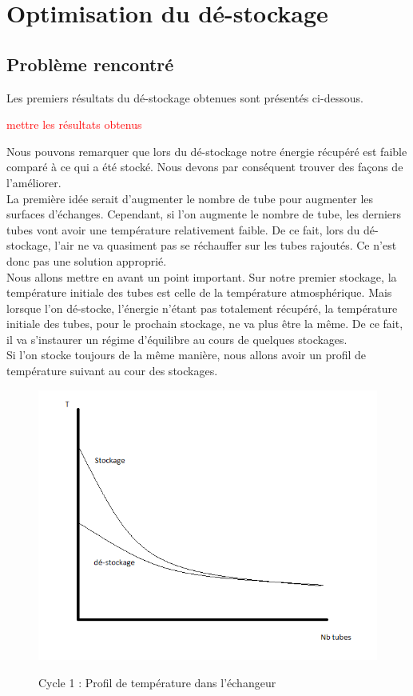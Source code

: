 \chapter{Optimisation du dé-stockage}

\section{Problème rencontré}

Les premiers résultats du dé-stockage obtenues sont présentés ci-dessous.


\textcolor{red}{mettre les résultats obtenus}


Nous pouvons remarquer que lors du dé-stockage notre énergie récupéré est faible comparé à ce qui a été stocké. Nous devons par conséquent trouver des façons de l'améliorer. \\

La première idée serait d'augmenter le nombre de tube pour augmenter les surfaces d'échanges. Cependant, si l'on augmente le nombre de tube, les derniers tubes vont avoir une température relativement faible. De ce fait, lors du dé-stockage, l'air ne va quasiment pas se réchauffer sur les tubes rajoutés. Ce n'est donc pas une solution approprié. \\

Nous allons mettre en avant un point important. Sur notre premier stockage, la température initiale des tubes est celle de la température atmosphérique. Mais lorsque l'on dé-stocke, l'énergie n'étant pas totalement récupéré, la température initiale des tubes, pour le prochain stockage, ne va plus être la même. De ce fait, il va s'instaurer un régime d'équilibre au cours de quelques stockages.\\

Si l'on stocke toujours de la même manière, nous allons avoir un profil de température suivant au cour des stockages. 

\begin{figure}[!h]
	\centering
	\caption{Cycle 1 : Profil de température dans l'échangeur}
	\includegraphics[scale=0.4]{PHOTO/courbe1.png}
	\label{graph1}
\end{figure}

